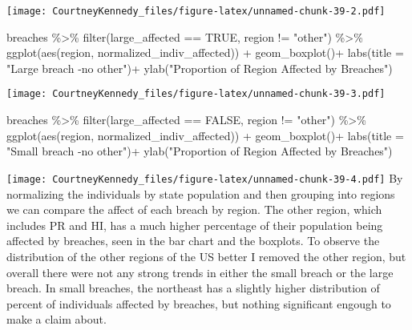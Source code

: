 \documentclass[
]{article}
\newenvironment{Shaded}{\begin{snugshade}}{\end{snugshade}}
\newcommand{\AttributeTok}[1]{\textcolor[rgb]{0.77,0.63,0.00}{#1}}
\newcommand{\ConstantTok}[1]{\textcolor[rgb]{0.00,0.00,0.00}{#1}}
\newcommand{\FunctionTok}[1]{\textcolor[rgb]{0.00,0.00,0.00}{#1}}
\newcommand{\NormalTok}[1]{#1}
\newcommand{\SpecialCharTok}[1]{\textcolor[rgb]{0.00,0.00,0.00}{#1}}
\newcommand{\StringTok}[1]{\textcolor[rgb]{0.31,0.60,0.02}{#1}}
\begin{document}
\texttt{[image: CourtneyKennedy\_files/figure-latex/unnamed-chunk-39-2.pdf]}

\begin{Shaded}
\begin{Highlighting}[]
\NormalTok{breaches }\SpecialCharTok{\%\textgreater{}\%}
  \FunctionTok{filter}\NormalTok{(large\_affected }\SpecialCharTok{==} \ConstantTok{TRUE}\NormalTok{, region }\SpecialCharTok{!=} \StringTok{"other"}\NormalTok{) }\SpecialCharTok{\%\textgreater{}\%}
  \FunctionTok{ggplot}\NormalTok{(}\FunctionTok{aes}\NormalTok{(region, normalized\_indiv\_affected)) }\SpecialCharTok{+}
  \FunctionTok{geom\_boxplot}\NormalTok{()}\SpecialCharTok{+}
  \FunctionTok{labs}\NormalTok{(}\AttributeTok{title =} \StringTok{"Large breach {-}no other"}\NormalTok{)}\SpecialCharTok{+}
  \FunctionTok{ylab}\NormalTok{(}\StringTok{"Proportion of Region Affected by Breaches"}\NormalTok{)}
\end{Highlighting}
\end{Shaded}

\texttt{[image: CourtneyKennedy\_files/figure-latex/unnamed-chunk-39-3.pdf]}

\begin{Shaded}
\begin{Highlighting}[]
\NormalTok{breaches }\SpecialCharTok{\%\textgreater{}\%}
  \FunctionTok{filter}\NormalTok{(large\_affected }\SpecialCharTok{==} \ConstantTok{FALSE}\NormalTok{, region }\SpecialCharTok{!=} \StringTok{"other"}\NormalTok{) }\SpecialCharTok{\%\textgreater{}\%}
  \FunctionTok{ggplot}\NormalTok{(}\FunctionTok{aes}\NormalTok{(region, normalized\_indiv\_affected)) }\SpecialCharTok{+}
  \FunctionTok{geom\_boxplot}\NormalTok{()}\SpecialCharTok{+}
  \FunctionTok{labs}\NormalTok{(}\AttributeTok{title =} \StringTok{"Small breach {-}no other"}\NormalTok{)}\SpecialCharTok{+}
  \FunctionTok{ylab}\NormalTok{(}\StringTok{"Proportion of Region Affected by Breaches"}\NormalTok{)}
\end{Highlighting}
\end{Shaded}

\texttt{[image: CourtneyKennedy\_files/figure-latex/unnamed-chunk-39-4.pdf]}
By normalizing the individuals by state population and then grouping
into regions we can compare the affect of each breach by region. The
other region, which includes PR and HI, has a much higher percentage of
their population being affected by breaches, seen in the bar chart and
the boxplots. To observe the distribution of the other regions of the US
better I removed the other region, but overall there were not any strong
trends in either the small breach or the large breach. In small
breaches, the northeast has a slightly higher distribution of percent of
individuals affected by breaches, but nothing significant engough to
make a claim about.
\end{document}
